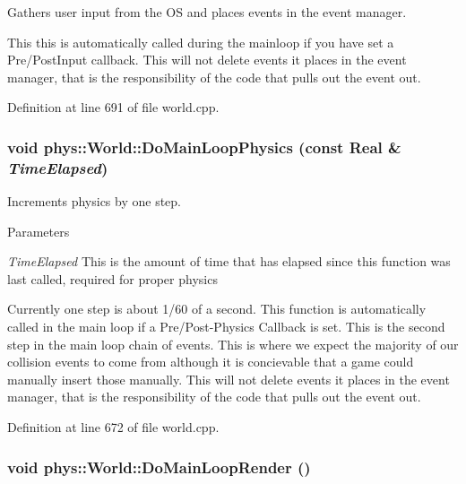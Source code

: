 Gathers user input from the OS and places events in the event manager. 

This this is automatically called during the mainloop if you have set a Pre/PostInput callback. This will not delete events it places in the event manager, that is the responsibility of the code that pulls out the event out. 

Definition at line 691 of file world.cpp.

\hypertarget{classphys_1_1World_a4596a7bd1dc49c3b45b5562fcd0d08f2}{
\subsubsection[{DoMainLoopPhysics}]{\setlength{\rightskip}{0pt plus 5cm}void phys::World::DoMainLoopPhysics (const {\bf Real} \& {\em TimeElapsed})}}
\label{da/ddf/classphys_1_1World_a4596a7bd1dc49c3b45b5562fcd0d08f2}


Increments physics by one step. 


\begin{DoxyParams}{Parameters}
\item[{\em TimeElapsed}]This is the amount of time that has elapsed since this function was last called, required for proper physics\end{DoxyParams}
Currently one step is about 1/60 of a second. This function is automatically called in the main loop if a Pre/Post-\/Physics Callback is set. This is the second step in the main loop chain of events. This is where we expect the majority of our collision events to come from although it is concievable that a game could manually insert those manually. This will not delete events it places in the event manager, that is the responsibility of the code that pulls out the event out. 

Definition at line 672 of file world.cpp.

\hypertarget{classphys_1_1World_a34133dd084f575a51209458dbe9ecdac}{
\subsubsection[{DoMainLoopRender}]{\setlength{\rightskip}{0pt plus 5cm}void phys::World::DoMainLoopRender ()}}
\label{da/ddf/classphys_1_1World_a34133dd084f575a51209458dbe9ecdac}


